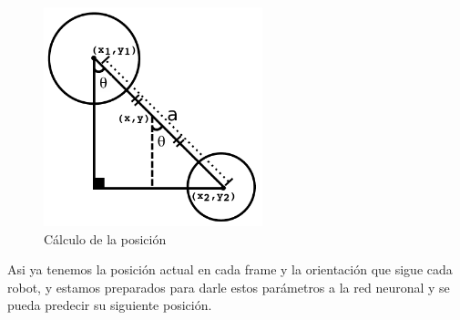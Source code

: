 \begin{figure}
\centering
\includegraphics[width=2.5in]{imagen2.pdf}
\caption{C\'alculo de la posici\'on}
\label{fig_cir}
\end{figure}
Asi ya tenemos la posici\'on actual en cada frame y la orientaci\'on que sigue cada robot, y estamos preparados para darle estos par\'ametros a la red neuronal  y se pueda predecir su siguiente posici\'on.
